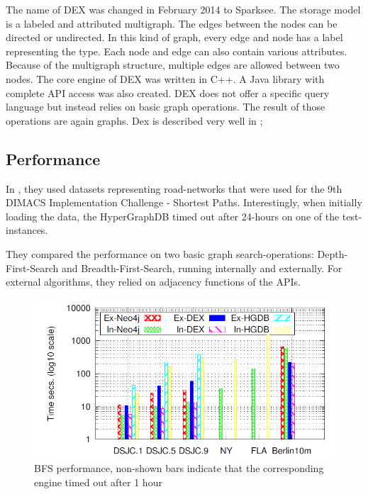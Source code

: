 \documentclass{acm_proc_article-sp}
\begin{document}
The name of DEX was changed in February 2014 to Sparksee. The storage model is a labeled and attributed multigraph. The edges between the nodes can be directed or undirected. In this kind of graph, every edge and node has a label representing the type. Each node and edge can also contain various attributes. Because of the multigraph structure, multiple edges are allowed between two nodes. The core engine of DEX was written in C++. A Java library with complete API access was also created. DEX does not offer a specific query language but instead relies on basic graph operations. The result of those operations are again graphs. Dex is described very well in \cite{dex};

\subsection{Performance}

In \cite{comparision}, they used datasets representing road-networks that were used for the 9th DIMACS Implementation Challenge - Shortest Paths. Interestingly, when initially loading the data, the HyperGraphDB timed out after 24-hours on one of the test-instances.

They compared the performance on two basic graph search-operations: Depth-First-Search and Breadth-First-Search, running internally and externally. For external algorithms, they relied on adjacency functions of the APIs.

\begin{figure}[hbtp]
	\centering
	\includegraphics[scale=0.32]{bfs.png}
	\caption{BFS performance, non-shown bars indicate that
		the corresponding engine timed out after 1 hour\cite{comparision}}
\end{figure}
\end{document}

